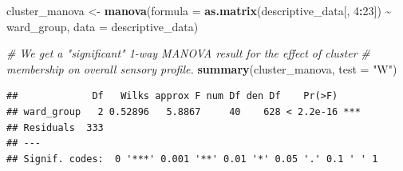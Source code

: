 \documentclass[
]{book}
\newenvironment{Shaded}{\begin{snugshade}}{\end{snugshade}}
\newcommand{\AttributeTok}[1]{\textcolor[rgb]{0.13,0.29,0.53}{#1}}
\newcommand{\CommentTok}[1]{\textcolor[rgb]{0.56,0.35,0.01}{\textit{#1}}}
\newcommand{\DecValTok}[1]{\textcolor[rgb]{0.00,0.00,0.81}{#1}}
\newcommand{\FunctionTok}[1]{\textcolor[rgb]{0.13,0.29,0.53}{\textbf{#1}}}
\newcommand{\NormalTok}[1]{#1}
\newcommand{\OtherTok}[1]{\textcolor[rgb]{0.56,0.35,0.01}{#1}}
\newcommand{\SpecialCharTok}[1]{\textcolor[rgb]{0.81,0.36,0.00}{\textbf{#1}}}
\newcommand{\StringTok}[1]{\textcolor[rgb]{0.31,0.60,0.02}{#1}}
\begin{document}
\begin{Shaded}
\begin{Highlighting}[]
\NormalTok{cluster\_manova }\OtherTok{\textless{}{-}} 
  \FunctionTok{manova}\NormalTok{(}\AttributeTok{formula =} \FunctionTok{as.matrix}\NormalTok{(descriptive\_data[, }\DecValTok{4}\SpecialCharTok{:}\DecValTok{23}\NormalTok{]) }\SpecialCharTok{\textasciitilde{}}\NormalTok{ ward\_group, }
         \AttributeTok{data =}\NormalTok{ descriptive\_data)}

\CommentTok{\# We get a "significant" 1{-}way MANOVA result for the effect of cluster}
\CommentTok{\# membership on overall sensory profile.}
\FunctionTok{summary}\NormalTok{(cluster\_manova, }\AttributeTok{test =} \StringTok{"W"}\NormalTok{)}
\end{Highlighting}
\end{Shaded}

\begin{verbatim}
##             Df   Wilks approx F num Df den Df    Pr(>F)    
## ward_group   2 0.52896   5.8867     40    628 < 2.2e-16 ***
## Residuals  333                                             
## ---
## Signif. codes:  0 '***' 0.001 '**' 0.01 '*' 0.05 '.' 0.1 ' ' 1
\end{verbatim}
\end{document}

